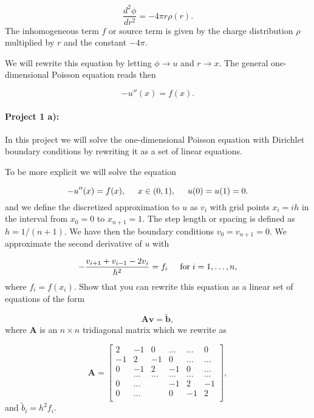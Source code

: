 \documentclass[%
oneside,                 %
final,                   %
10pt]{article}
\begin{document}
\begin{equation*}
\frac{d^2\phi}{dr^2}= -4\pi r\rho(r).
\end{equation*}
The inhomogeneous term $f$ or source term is given by the charge distribution
$\rho$  multiplied by $r$ and the constant $-4\pi$.

We will rewrite this equation by letting $\phi\rightarrow u$ and 
$r\rightarrow x$. 
The general one-dimensional Poisson equation reads then

\begin{equation*}
-u''(x) = f(x).
\end{equation*}


\paragraph{Project 1 a):}
In this project we will solve the one-dimensional Poisson equation
with Dirichlet boundary conditions by rewriting it as a set of linear equations.


To be more explicit we will solve the equation

\begin{equation*}
-u''(x) = f(x), \hspace{0.5cm} x\in(0,1), \hspace{0.5cm} u(0) = u(1) = 0.
\end{equation*}
and we define the discretized approximation  to $u$ as $v_i$  with 
grid points $x_i=ih$   in the interval from $x_0=0$ to $x_{n+1}=1$.
The step length or spacing is defined as $h=1/(n+1)$. 
We have then the boundary conditions $v_0 = v_{n+1} = 0$.
We  approximate the second
derivative of $u$ with

\begin{equation*}
   -\frac{v_{i+1}+v_{i-1}-2v_i}{h^2} = f_i  \hspace{0.5cm} \mathrm{for} \hspace{0.1cm} i=1,\dots, n,
\end{equation*}
where $f_i=f(x_i)$.
Show that you can rewrite this equation as a linear set of equations of the form

\begin{equation*}
   \mathbf{A}\mathbf{v} = \tilde{\mathbf{b}},
\end{equation*}
where $\mathbf{A}$ is an $n\times n$  tridiagonal matrix which we rewrite as

\[
    \mathbf{A} = \begin{bmatrix}
                           2& -1& 0 &\dots   & \dots &0 \\
                           -1 & 2 & -1 &0 &\dots &\dots \\
                           0&-1 &2 & -1 & 0 & \dots \\
                           & \dots   & \dots &\dots   &\dots & \dots \\
                           0&\dots   &  &-1 &2& -1 \\
                           0&\dots    &  & 0  &-1 & 2 \\
                      \end{bmatrix},
\]
and $\tilde{b}_i=h^2f_i$.
\end{document}
